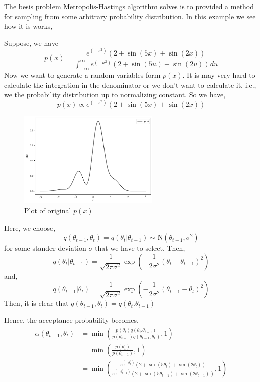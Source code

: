 \begin{example}
    The besis problem Metropolis-Hastings algorithm solves is to provided a method for sampling from some arbitrary probability distribution. In this example we see how it is works,

    Suppose, we have 
    \[
        p(x) = \frac{e^{(-x^2)} \left( 2 + \sin(5x) + \sin(2x) \right) }{ \int_{-\infty}^{\infty} e^{(-u^2)} \left( 2 + \sin(5u) + \sin(2u) \right) du }
    \]
    Now we want to generate a random variables form $ p(x) $. It is may very hard to calculate the integration in the denominator or we don't want to calculate it. i.e., we the probability distribution up to normalizing constant.
    So we have,
    \[
        p(x) \propto e^{(-x^2)} \left( 2 + \sin(5x) + \sin(2x) \right) 
    \]
    \begin{figure}[H]
        \centering
        \includegraphics[width=0.6\textwidth]{./images/metropolis/plot-of-px.png}
        \caption{Plot of original $p(x)$}
        \label{plot of px}
    \end{figure}

    Here, we choose,
    \[
        q(\theta_{t-1}, \theta_{t}) = q(\theta_t|\theta_{t-1}) \sim \text{N}(\theta_{t-1},\sigma^2)
    \]
    for some stander deviation $ \sigma $ that we have to select.
    Then,
    \[
        q(\theta_{t} | \theta_{t-1}) = \frac{1}{\sqrt{2 \pi \sigma^2}} \exp \left( - \frac{1}{2 \sigma^2} (\theta_t - \theta_{t-1})^2 \right) 
    \]
    and,
    \[
        q(\theta_{t-1}|\theta_t) = \frac{1}{\sqrt{2 \pi \sigma^2}} \exp \left( - \frac{1}{2 \sigma^2} (\theta_{t-1} - \theta_{t})^2 \right)
    \]
    Then, it is clear that $ q(\theta_{t-1},\theta_t) = q(\theta_t.\theta_{t-1}) $
    
    Hence, the acceptance probability becomes,
    \begin{align*}
        \alpha(\theta_{t-1},\theta_{t}) &= \min \left(  \frac{p(\theta_t)q(\theta_t.\theta_{t-1})}{p(\theta_{t-1})q(\theta_{t-1},\theta_t)}  , 1 \right) \\ 
                                        &= \min \left( \frac{p(\theta_t)}{p(\theta_{t-1})} , 1 \right) \\
                                        &= \min \left( \frac{e^{(-\theta_t^2)}(2 + \sin(5 \theta_t) + \sin(2 \theta_t)) }{e^{(-\theta_{t-1}^2)}(2 + \sin(5 \theta_{t-1}) + \sin(2 \theta_{t-1})) }  , 1 \right)
    \end{align*}
    

\end{example}
